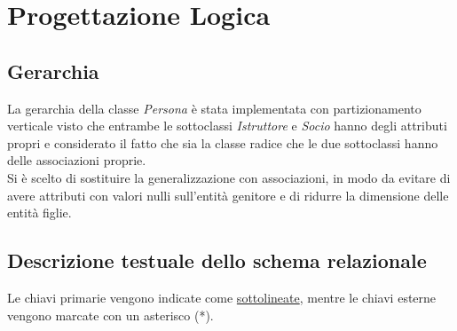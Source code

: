 \chapter{Progettazione Logica} 

\section{Gerarchia}
La gerarchia della classe \textit{Persona} è stata implementata con partizionamento verticale visto che entrambe le sottoclassi \textit{Istruttore} e \textit{Socio} hanno degli attributi propri e considerato il fatto che sia la classe radice che le due sottoclassi hanno delle associazioni proprie.\\
Si è scelto di sostituire la generalizzazione con associazioni, in modo da evitare di avere attributi con valori nulli sull'entità genitore e di ridurre la dimensione delle entità figlie. 

\section{Descrizione testuale dello schema relazionale}
Le chiavi primarie vengono indicate come \underline{sottolineate}, mentre le chiavi esterne vengono marcate con un asterisco (*).\\

